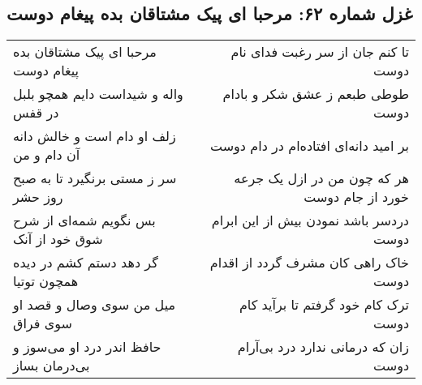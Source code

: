 \begin{center}
\section*{غزل شماره ۶۲: مرحبا ای پیک مشتاقان بده پیغام دوست}
\label{sec:sh062}
\begin{longtable}{l p{0.5cm} r}
مرحبا ای پیک مشتاقان بده پیغام دوست
&&
تا کنم جان از سر رغبت فدای نام دوست
\\
واله و شیداست دایم همچو بلبل در قفس
&&
طوطی طبعم ز عشق شکر و بادام دوست
\\
زلف او دام است و خالش دانه آن دام و من
&&
بر امید دانه‌ای افتاده‌ام در دام دوست
\\
سر ز مستی برنگیرد تا به صبح روز حشر
&&
هر که چون من در ازل یک جرعه خورد از جام دوست
\\
بس نگویم شمه‌ای از شرح شوق خود از آنک
&&
دردسر باشد نمودن بیش از این ابرام دوست
\\
گر دهد دستم کشم در دیده همچون توتیا
&&
خاک راهی کان مشرف گردد از اقدام دوست
\\
میل من سوی وصال و قصد او سوی فراق
&&
ترک کام خود گرفتم تا برآید کام دوست
\\
حافظ اندر درد او می‌سوز و بی‌درمان بساز
&&
زان که درمانی ندارد درد بی‌آرام دوست
\\
\end{longtable}
\end{center}
